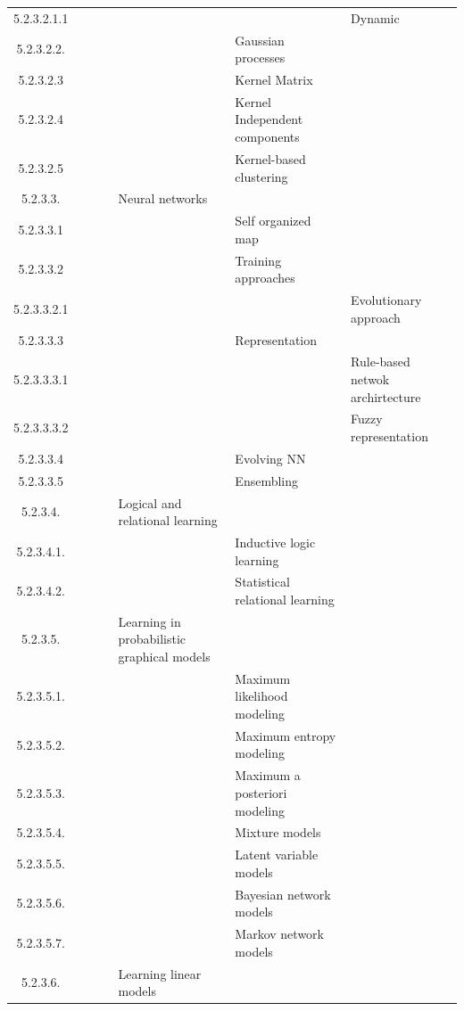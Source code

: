 \documentclass[12pt]{article}
\begin{document}
\begin{center}
{\begin{tabularx}{\linewidth}{|c|X|X|X|X|X|X|}
		5.2.3.2.1.1 &   &   &   &   &   &  Dynamic \\
		5.2.3.2.2. &   &   &   &   &  Gaussian processes &   \\
		5.2.3.2.3 &   &   &   &   &  Kernel Matrix &   \\
		5.2.3.2.4 &   &   &   &   &  Kernel Independent components &   \\
		5.2.3.2.5 &   &   &   &   &  Kernel-based clustering &   \\
		5.2.3.3. &   &   &   &  Neural networks &   &   \\
		5.2.3.3.1 &   &   &   &   &  Self organized map &   \\
		5.2.3.3.2 &   &   &   &   &  Training approaches &   \\
		5.2.3.3.2.1 &   &   &   &   &   &  Evolutionary approach \\
		5.2.3.3.3 &   &   &   &   &  Representation &   \\
		5.2.3.3.3.1 &   &   &   &   &   &  Rule-based netwok archirtecture \\
		5.2.3.3.3.2 &   &   &   &   &   &  Fuzzy representation \\
		5.2.3.3.4 &   &   &   &   &  Evolving NN &   \\
		5.2.3.3.5 &   &   &   &   &  Ensembling &   \\
		5.2.3.4. &   &   &   &  Logical and relational learning &   &   \\
		5.2.3.4.1. &   &   &   &   &  Inductive logic learning &   \\
		5.2.3.4.2. &   &   &   &   &  Statistical relational learning &   \\
		5.2.3.5. &   &   &   &  Learning in probabilistic graphical models &   &   \\
		5.2.3.5.1. &   &   &   &   &  Maximum likelihood modeling &   \\
		5.2.3.5.2. &   &   &   &   &  Maximum entropy modeling &   \\
		5.2.3.5.3. &   &   &   &   &  Maximum a posteriori modeling &   \\
		5.2.3.5.4. &   &   &   &   &  Mixture models &   \\
		5.2.3.5.5. &   &   &   &   &  Latent variable models &   \\
		5.2.3.5.6. &   &   &   &   &  Bayesian network models &   \\
		5.2.3.5.7. &   &   &   &   &  Markov network models &   \\
		5.2.3.6. &   &   &   &  Learning linear models &   &   \\

\end{tabularx}}
\end{center}
\end{document}
